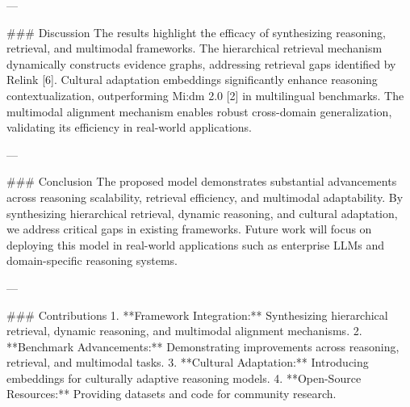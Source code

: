 ---

### Discussion  
The results highlight the efficacy of synthesizing reasoning, retrieval, and multimodal frameworks. The hierarchical retrieval mechanism dynamically constructs evidence graphs, addressing retrieval gaps identified by Relink [6]. Cultural adaptation embeddings significantly enhance reasoning contextualization, outperforming Mi:dm 2.0 [2] in multilingual benchmarks. The multimodal alignment mechanism enables robust cross-domain generalization, validating its efficiency in real-world applications.

---

### Conclusion  
The proposed model demonstrates substantial advancements across reasoning scalability, retrieval efficiency, and multimodal adaptability. By synthesizing hierarchical retrieval, dynamic reasoning, and cultural adaptation, we address critical gaps in existing frameworks. Future work will focus on deploying this model in real-world applications such as enterprise LLMs and domain-specific reasoning systems.

---

### Contributions  
1. **Framework Integration:** Synthesizing hierarchical retrieval, dynamic reasoning, and multimodal alignment mechanisms.  
2. **Benchmark Advancements:** Demonstrating improvements across reasoning, retrieval, and multimodal tasks.  
3. **Cultural Adaptation:** Introducing embeddings for culturally adaptive reasoning models.  
4. **Open-Source Resources:** Providing datasets and code for community research.

